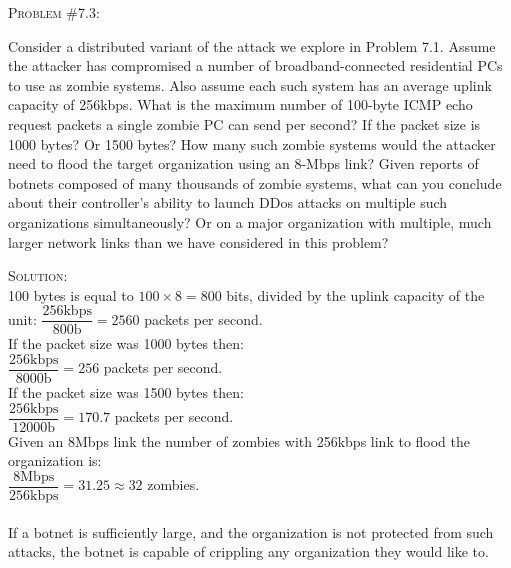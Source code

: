 \documentclass[12pt]{article}
\newenvironment{problem}[1]
{\begin{mdframed}[linewidth=0.8pt]
        \textsc{Problem #1:}

}
    {\end{mdframed}}
\newenvironment{solution}
    {\textsc{Solution:}\\}
    {\newpage}%
\begin{document}
	\begin{problem}{\#7.3}
		Consider a distributed variant of the attack we explore in Problem 7.1. Assume the attacker has compromised a number of broadband-connected residential PCs to use as zombie systems. Also assume each such system has an average uplink capacity of 256kbps. What is the maximum number of 100-byte ICMP echo request packets a single zombie PC can send per second? If the packet size is 1000 bytes? Or 1500 bytes? How many such zombie systems would the attacker need to flood the target organization using an 8-Mbps link? Given reports of botnets composed of many thousands of zombie systems, what can you conclude about their controller's ability to launch DDos attacks on multiple such organizations simultaneously? Or on a major organization with multiple, much larger network links than we have considered in this problem?
	\end{problem}
	\begin{solution}
		100 bytes is equal to $100 \times 8 = 800$ bits, divided by the uplink capacity of the unit: $\dfrac{256\text{kbps}}{800\text{b}} = 2560$ packets per second.\\
		If the packet size was 1000 bytes then:\\
		$\dfrac{256\text{kbps}}{8000\text{b}} = 256$ packets per second.\\
		If the packet size was 1500 bytes then:\\
		$\dfrac{256\text{kbps}}{12000\text{b}} = 170.7$ packets per second.\\
		Given an 8Mbps link the number of zombies with 256kbps link to flood the organization is:\\
		$\dfrac{8\text{Mbps}}{256\text{kbps}} = 31.25 \approx 32$ zombies.\\
		\\
		If a botnet is sufficiently large, and the organization is not protected from such attacks, the botnet is capable of crippling any organization they would like to.
	\end{solution}
\end{document}
